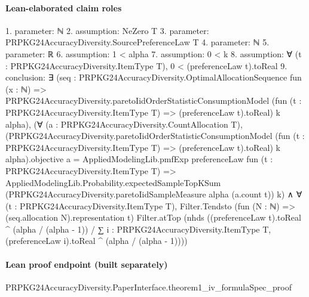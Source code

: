 \documentclass[10pt]{article}
\begin{document}
\paragraph{Lean-elaborated claim roles}\begin{ReviewVerbatim}
1. parameter: ℕ
2. assumption: NeZero T
3. parameter: PRPKG24AccuracyDiversity.SourcePreferenceLaw T
4. parameter: ℕ
5. parameter: ℝ
6. assumption: 1 < alpha
7. assumption: 0 < k
8. assumption: ∀ (t : PRPKG24AccuracyDiversity.ItemType T), 0 < (preferenceLaw t).toReal
9. conclusion: ∃ (seq :
  PRPKG24AccuracyDiversity.OptimalAllocationSequence fun (x : ℕ) =>
    PRPKG24AccuracyDiversity.paretoIidOrderStatisticConsumptionModel
      (fun (t : PRPKG24AccuracyDiversity.ItemType T) => (preferenceLaw t).toReal) k alpha),
  (∀ (a : PRPKG24AccuracyDiversity.CountAllocation T),
      (PRPKG24AccuracyDiversity.paretoIidOrderStatisticConsumptionModel
              (fun (t : PRPKG24AccuracyDiversity.ItemType T) => (preferenceLaw t).toReal) k alpha).objective
          a =
        AppliedModelingLib.pmfExp preferenceLaw fun (t : PRPKG24AccuracyDiversity.ItemType T) =>
          AppliedModelingLib.Probability.expectedSampleTopKSum
            (PRPKG24AccuracyDiversity.paretoIidSampleMeasure alpha (a.count t)) k) ∧
    ∀ (t : PRPKG24AccuracyDiversity.ItemType T),
      Filter.Tendsto (fun (N : ℕ) => (seq.allocation N).representation t) Filter.atTop
        (nhds
          ((preferenceLaw t).toReal ^ (alpha / (alpha - 1)) /
            ∑ i : PRPKG24AccuracyDiversity.ItemType T, (preferenceLaw i).toReal ^ (alpha / (alpha - 1))))
\end{ReviewVerbatim}

\paragraph{Lean proof endpoint (built separately)}\begin{ReviewVerbatim}
PRPKG24AccuracyDiversity.PaperInterface.theorem1_iv_formulaSpec_proof
\end{ReviewVerbatim}
\end{document}
